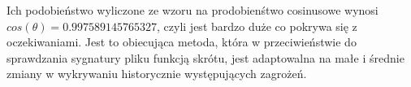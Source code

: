 Ich podobieństwo wyliczone ze wzoru na prodobienśtwo cosinusowe wynosi $cos(\theta) = 0.997589145765327$, czyli jest bardzo duże co pokrywa się z oczekiwaniami. Jest to obiecująca metoda, która w przeciwieństwie do sprawdzania sygnatury pliku funkcją skrótu, jest adaptowalna na małe i średnie zmiany w wykrywaniu historycznie występujących zagrożeń. 
